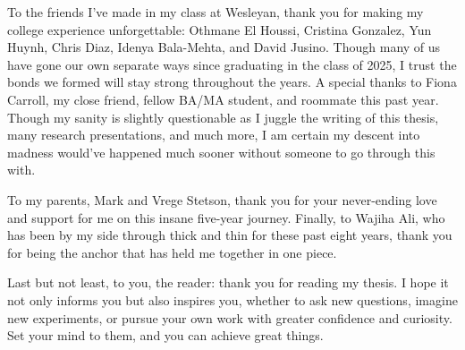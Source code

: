 \documentclass[12pt,oneside]{book}
\begin{document}
To the friends I've made in my class at Wesleyan, thank you for making my college experience unforgettable: Othmane El Houssi, Cristina Gonzalez, Yun Huynh, Chris Diaz, Idenya Bala-Mehta, and David Jusino. Though many of us have gone our own separate ways since graduating in the class of 2025, I trust the bonds we formed will stay strong throughout the years. A special thanks to Fiona Carroll, my close friend, fellow BA/MA student, and roommate this past year. Though my sanity is slightly questionable as I juggle the writing of this thesis, many research presentations, and much more, I am certain my descent into madness would've happened much sooner without someone to go through this with.

To my parents, Mark and Vrege Stetson, thank you for your never-ending love and support for me on this insane five-year journey. Finally, to Wajiha Ali, who has been by my side through thick and thin for these past eight years, thank you for being the anchor that has held me together in one piece.

Last but not least, to you, the reader: thank you for reading my thesis. I hope it not only informs you but also inspires you, whether to ask new questions, imagine new experiments, or pursue your own work with greater confidence and curiosity. Set your mind to them, and you can achieve great things.
\end{document}
